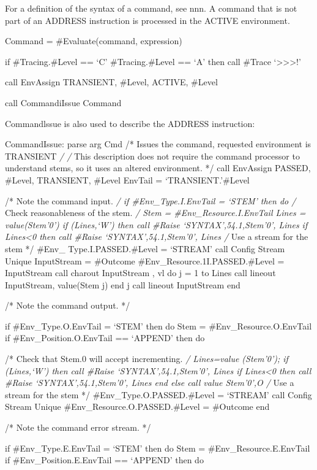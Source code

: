 For a definition of the syntax of a command, see nnn. A command that is
not part of an ADDRESS instruction is processed in the ACTIVE
environment.

Command = \#Evaluate(command, expression)

if \#Tracing.\#Level == `C' \textbar{} \#Tracing.\#Level == `A' then
call \#Trace `\textgreater\textgreater\textgreater!'

call EnvAssign TRANSIENT, \#Level, ACTIVE, \#Level

call CommandiIssue Command

Commandlssue is also used to describe the ADDRESS instruction:

CommandIssue: parse arg Cmd /* Issues the command, requested environment
is TRANSIENT \emph{/ /} This description does not require the command
processor to understand stems, so it uses an altered environment. */
call EnvAssign PASSED, \#Level, TRANSIENT, \#Level EnvTail =
`TRANSIENT.'\#Level

/* Note the command input. \emph{/ if \#Env\_Type.I.EnvTail = `STEM'
then do /} Check reasonableness of the stem. \emph{/ Stem =
\#Env\_Resource.I.EnvTail Lines = value(Stem'0') if \datatype(Lines,`W')
then call \#Raise `SYNTAX',54.1,Stem'0', Lines if Lines\textless0 then
call \#Raise `SYNTAX',54.1,Stem'0', Lines /} Use a stream for the stem
*/ \#Env\_ Type.I.PASSED.\#Level = `STREAM' call Config Stream Unique
InputStream = \#Outcome \#Env\_Resource.1I.PASSED.\#Level = InputStream
call charout InputStream , vl do j = 1 to Lines call lineout
InputStream, value(Stem \textbar\textbar{} j) end j call lineout
InputStream end

/* Note the command output. */

if \#Env\_Type.O.EnvTail = `STEM' then do Stem =
\#Env\_Resource.O.EnvTail if \#Env\_Position.O.EnvTail == `APPEND' then
do

/* Check that Stem.0 will accept incrementing. \emph{/ Lines=value
(Stem'0'); if \datatype(Lines,`W') then call \#Raise
`SYNTAX',54.1,Stem'0', Lines if Lines\textless0 then call \#Raise
`SYNTAX',54.1,Stem'0', Lines end else call value Stem'0',O /} Use a
stream for the stem */ \#Env\_Type.O.PASSED.\#Level = `STREAM' call
Config Stream Unique \#Env\_Resource.O.PASSED.\#Level = \#Outcome end

/* Note the command error stream. */

if \#Env\_Type.E.EnvTail = `STEM' then do Stem =
\#Env\_Resource.E.EnvTail if \#Env\_Position.E.EnvTail == `APPEND' then
do

